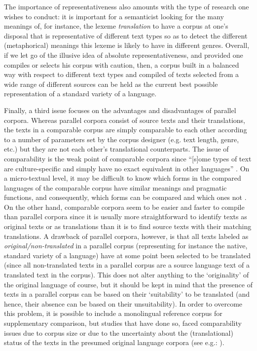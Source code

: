 The importance of representativeness also amounts with the type of research one wishes to conduct: it is important for a semanticist looking for the many meanings of, for instance, the lexeme \textit{translation} to have a corpus at one’s disposal that is representative of different text types so as to detect the different (metaphorical) meanings this lexeme is likely to have in different genres. Overall, if we let go of the illusive idea of absolute representativeness, and provided one compiles or selects his corpus with caution, then, a corpus built in a balanced way with respect to different text types and compiled of texts selected from a wide range of different sources can be held as the current best possible representation of a standard variety of a language.

Finally, a third issue focuses on the advantages and disadvantages of parallel corpora. Whereas parallel corpora consist of source texts and their translations, the texts in a comparable corpus are simply comparable to each other according to a number of parameters set by the corpus designer (e.g. text length, genre, etc.) but they are not each other’s translational counterparts. The issue of comparability is the weak point of comparable corpora since “[s]ome types of text are culture-specific and simply have no exact equivalent in other languages” \citep[19]{granger_corpus_2003}. On a micro-textual level, it may be difficult to know which forms in the compared languages of the comparable corpus have similar meanings and pragmatic functions, and consequently, which forms can be compared and which ones not \citep[5]{johansson_translational_1998}. On the other hand, comparable corpora seem to be easier and faster to compile than parallel corpora since it is usually more straightforward to identify texts as original texts or as translations than it is to find source texts with their matching translations. A drawback of parallel corpora, however, is that all texts labeled as \textit{original/non-translated} in a parallel corpus (representing for instance the native, standard variety of a language) have at some point been selected to be translated (since all non-translated texts in a parallel corpus are a source language text of a translated text in the corpus). This does not alter anything to the ‘originality’ of the original language of course, but it should be kept in mind that the presence of texts in a parallel corpus can be based on their ‘suitability’ to be translated (and hence, their absence can be based on their unsuitability). In order to overcome this problem, it is possible to include a monolingual reference corpus for supplementary comparison, but studies that have done so, faced comparability issues due to corpus size or due to the uncertainty about the (translational) status of the texts in the presumed original language corpora (see e.g.: \citealt{musolff_conceptual_2014}).

